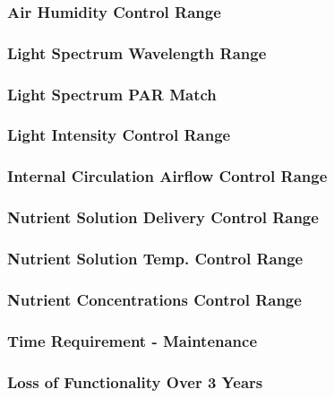 \documentclass{report}
\begin{document}
\subsubsection{Air Humidity Control Range} %

\subsubsection{Light Spectrum Wavelength Range} %

\subsubsection{Light Spectrum PAR Match} %

\subsubsection{Light Intensity Control Range} %

\subsubsection{Internal Circulation Airflow Control Range} %

\subsubsection{Nutrient Solution Delivery Control Range} %

\subsubsection{Nutrient Solution Temp. Control Range} %

\subsubsection{Nutrient Concentrations Control Range} %

\subsubsection{Time Requirement - Maintenance} %

\subsubsection{Loss of Functionality Over 3 Years} %
\end{document}
